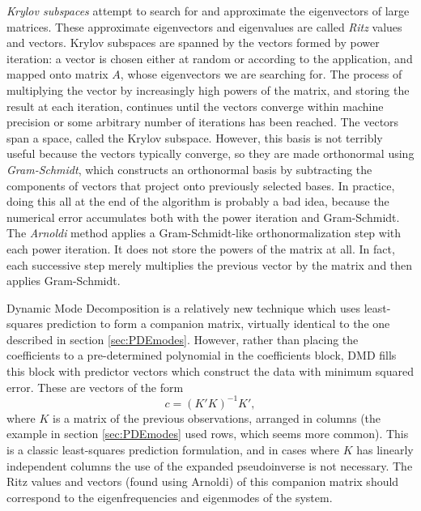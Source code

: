 \documentclass[a4paper,10pt]{report}
\numberwithin{equation}{section}
\begin{document}
\emph{Krylov subspaces} attempt to search for and approximate the eigenvectors of large matrices. These approximate eigenvectors and eigenvalues are called \emph{Ritz} values and vectors. Krylov subspaces are spanned by the vectors formed by power iteration: a vector is chosen either at random or according to the application, and mapped onto matrix $A$, whose eigenvectors we are searching for. The process of multiplying the vector by increasingly high powers of the matrix, and storing the result at each iteration, continues until the vectors converge within machine precision or some arbitrary number of iterations has been reached. The vectors span a space, called the Krylov subspace. \cite[p.~428]{Watkins2010} However, this basis is not terribly useful because the vectors typically converge, so they are made orthonormal using \emph{Gram-Schmidt}, which constructs an orthonormal basis by subtracting the components of vectors that project onto previously selected bases. \cite[p.~234]{Strang2009} In practice, 
doing this all at the end of the algorithm is probably a bad idea, because the numerical error accumulates both with the power iteration and Gram-Schmidt. \cite[p.~439]{Watkins2010} The \emph{Arnoldi} method applies a Gram-Schmidt-like orthonormalization step with each power iteration. It does not store the powers of the matrix at all. In fact, each successive step merely multiplies the previous vector by the matrix and then applies Gram-Schmidt. \cite[p.~440]{Watkins2010} 

Dynamic Mode Decomposition \cite{Chen2012} is a relatively new technique which uses least-squares prediction to form a companion matrix, virtually identical to the one described in section \ref{sec:PDEmodes}. However, rather than placing the coefficients to a pre-determined polynomial in the coefficients block, DMD fills this block with predictor vectors which construct the data with minimum squared error. These are vectors of the form
\begin{equation}\label{normal_eq}
c = (K'  K)^{-1} K' , 
\end{equation}
where $K$ is a matrix of the previous observations, arranged in columns (the example in section \ref{sec:PDEmodes} used rows, which seems more common). This is a classic least-squares prediction formulation, and in cases where $K$ has linearly independent columns the use of the expanded pseudoinverse is not necessary. The Ritz values and vectors (found using Arnoldi) of this companion matrix should correspond to the eigenfrequencies and eigenmodes of the system. \cite{Chen2012}
\end{document}
